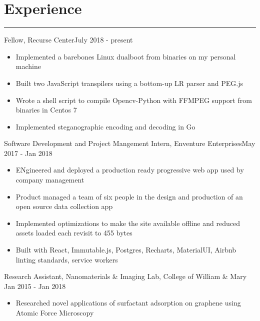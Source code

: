 \documentclass[12pt]{article}
\begin{document}
\vspace{-0.30cm}
\section*{Experience}
\vspace{-0.25cm}
\hrule
\vspace{0.25cm}

\noindent Fellow, Recurse Center\hfill July 2018 - present
\vspace{-0.2cm}
\begin{itemize}
  \itemsep-0.4em
	\item Implemented a barebones Linux dualboot from binaries on my personal machine
	\item Built two JavaScript transpilers using a bottom-up LR parser and PEG.js
	\item Wrote a shell script to compile Opencv-Python with FFMPEG support from binaries in Centos 7
        \item Implemented steganographic encoding and decoding in Go
\end{itemize}

\noindent Software Development and Project Mangement Intern, Enventure Enterprises\hfill May 2017 - Jan 2018
\vspace{-0.2cm}
\begin{itemize}
  \itemsep-0.4em
	\item ENgineered and deployed a production ready progressive web app used by company management
	\item Product managed a team of six people in the design and production of an open source data collection app
	\item Implemented optimizations to make the site available offline and reduced assets loaded each revisit to 455 bytes
        \item Built with React, Immutable.js, Postgres, Recharts, MaterialUI, Airbnb linting standards, service workers
\end{itemize}

\noindent Research Assistant, Nanomaterials & Imaging Lab, College of William & Mary \hfill Jan 2015 - Jan 2018
\vspace{-0.2cm}
\begin{itemize}
  \itemsep-0.4em
	\item Researched novel applications of surfactant adsorption on graphene using Atomic Force Microscopy
\end{itemize}
\end{document}
